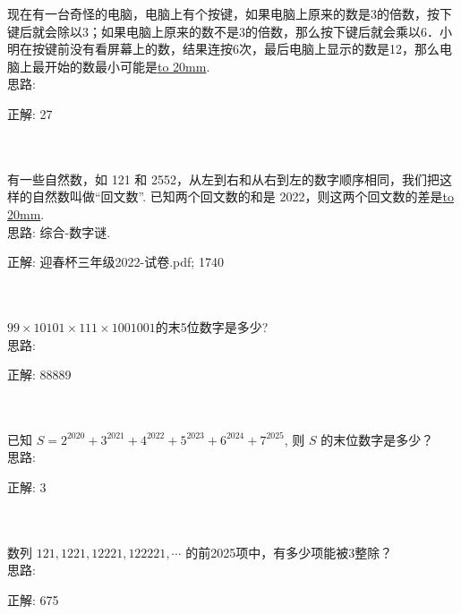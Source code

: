 \item {
    现在有一台奇怪的电脑，电脑上有个按键，如果电脑上原来的数是3的倍数，按下键后就会除以3；如果电脑上原来的数不是3的倍数，那么按下键后就会乘以6．小明在按键前没有看屏幕上的数，结果连按6次，最后电脑上显示的数是12，那么电脑上最开始的数最小可能是\underline{\hbox to 20mm{}}.
    \ifshowSolution
        \fangsong{}
        \\
        思路:

        正解: 27
    \else
        \\ \\ \\
    \fi
}
\item {
    有一些自然数，如 121 和 2552，从左到右和从右到左的数字顺序相同，我们把这样的自然数叫做``回文数''. 已知两个回文数的和是 2022，则这两个回文数的差是\underline{\hbox to 20mm{}}.
    \ifshowSolution
        \fangsong{}
        \\
        思路: 综合-数字谜.

        正解:  迎春杯三年级2022-试卷.pdf; 1740
    \else
        \\ \\ \\
    \fi
}

\item {
    $99\times 10101\times 111\times 1001001$的末5位数字是多少?
    \ifshowSolution
        \fangsong{}
        \\
        思路:

        正解: 88889
    \else
        \\ \\ \\
    \fi
}

\item {
    已知 $S = 2^{2020} + 3^{2021} + 4^{2022} + 5^{2023} +6^{2024} + 7^{2025}$, 则 $S$ 的末位数字是多少？
    \ifshowSolution
        \fangsong{}
        \\
        思路:

        正解: 3
    \else
        \\ \\ \\
    \fi
}

\item {
    数列 $121, 1221, 12221, 122221,\cdots$ 的前2025项中，有多少项能被3整除？
    \ifshowSolution
        \fangsong{}
        \\
        思路:

        正解: 675
    \else
        \\ \\ \\
    \fi
}

